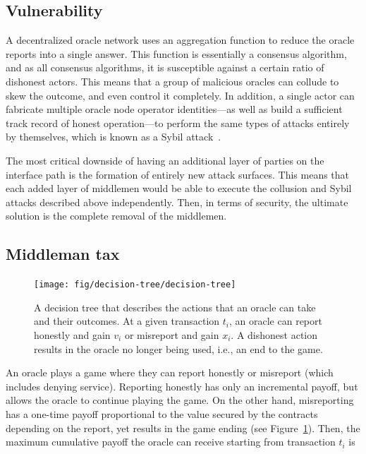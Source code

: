 \documentclass[11pt]{article}
\begin{document}
\subsection{Vulnerability}
\label{sec:vulnerability}

A decentralized oracle network uses an aggregation function to reduce the oracle reports into a single answer.
This function is essentially a consensus algorithm, and as all consensus algorithms, it is susceptible against a certain ratio of dishonest actors.
This means that a group of malicious oracles can collude to skew the outcome, and even control it completely.
In addition, a single actor can fabricate multiple oracle node operator identities—as well as build a sufficient track record of honest operation—to perform the same types of attacks entirely by themselves, which is known as a Sybil attack~\cite{douceur:2002}.

The most critical downside of having an additional layer of parties on the interface path is the formation of entirely new attack surfaces.
This means that each added layer of middlemen would be able to execute the collusion and Sybil attacks described above independently.
Then, in terms of security, the ultimate solution is the complete removal of the middlemen.

\subsection{Middleman tax}
\label{sec:middleman-tax}

\begin{figure}
    \centering
	\texttt{[image: fig/decision-tree/decision-tree]}
	\caption{A decision tree that describes the actions that an oracle can take and their outcomes.
	At a given transaction $t_i$, an oracle can report honestly and gain $v_i$ or misreport and gain $x_i$.
	A dishonest action results in the oracle no longer being used, i.e., an end to the game.}
	\label{fig:decision-tree}
\end{figure}

An oracle plays a game where they can report honestly or misreport (which includes denying service).
Reporting honestly has only an incremental payoff, but allows the oracle to continue playing the game.
On the other hand, misreporting has a one-time payoff proportional to the value secured by the contracts depending on the report, yet results in the game ending (see Figure~\ref{fig:decision-tree}).
Then, the maximum cumulative payoff the oracle can receive starting from transaction $t_i$ is
\end{document}
